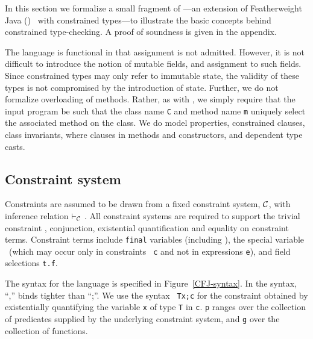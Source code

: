 \def\TConstr{\mbox{\sc T-Constr}}
\def\TInv{\mbox{\sc T-Inv}}
\def\TVar{\mbox{\sc T-Var}}
\def\TField{\mbox{\sc T-Field}}
\def\TInvk{\mbox{\sc T-Invk}}
\def\TNew{\mbox{\sc T-New}}
\def\TCast{\mbox{\sc T-Cast}}
\def\TUCast{\mbox{\sc T-UCast}}
\def\TDCast{\mbox{\sc T-DCast}}
\def\TSCast{\mbox{\sc T-SCast}}

\def\RField{\mbox{\sc R-Field}}
\def\RCField{\mbox{\sc RC-Field}}
\def\RInvk{\mbox{\sc R-Invk}}
\def\RCInvkRecv{\mbox{\sc RC-Invk-Recv}}
\def\RCInvkArg{\mbox{\sc RC-Invk-Arg}}
\def\RCNewArg{\mbox{\sc RC-New-Arg}}
\def\RCast{\mbox{\sc R-Cast}}
\def\RCCast{\mbox{\sc RC-Cast}}

In this section we formalize a small fragment of \Xten{}---an extension
of Featherweight Java (\FJ{})~\cite{FJ} with constrained
types---to illustrate
the basic concepts behind constrained type-checking.
A proof of
soundness is given in the appendix.

The language is functional in that assignment is not
admitted. However, it is not difficult to introduce the notion of
mutable fields, and assignment to such fields. Since constrained types
may only refer to immutable state, the validity of these types is not
compromised by the introduction of state.
%
Further, we do not formalize overloading of methods. Rather, as
with \FJ{}, we simply require that the input program be such that the class
name {\tt C} and method name {\tt m} uniquely select the associated
method on the class. 
%
We do model properties, constrained clauses, class invariants, where
clauses in methods and constructors, and dependent type casts.

\subsection{Constraint system}

Constraints are assumed to be drawn from a fixed constraint system,
$\cal C$, with inference relation $\vdash_{\cal C}$ \cite{CCCC}.
All
constraint systems are required to support the trivial constraint
\true, conjunction, existential quantification and equality on
constraint terms. Constraint terms include {\tt final} variables
(including \this), the
special variable \self\ (which may occur only in constraints {\tt
c} and not in expressions {\tt e}), and field selections {\tt t.f}. 

The syntax for the language is specified in Figure~\ref{CFJ-syntax}.
In the syntax, ``,'' binds tighter than ``;''. We use the syntax {\tt
{\tt T\;x};\;c} for the constraint obtained by existentially quantifying the
variable {\tt x} of type {\tt T} in {\tt c}. {\tt p} ranges over
the collection of predicates supplied by the underlying constraint
system, and {\tt g} over the collection of functions.

